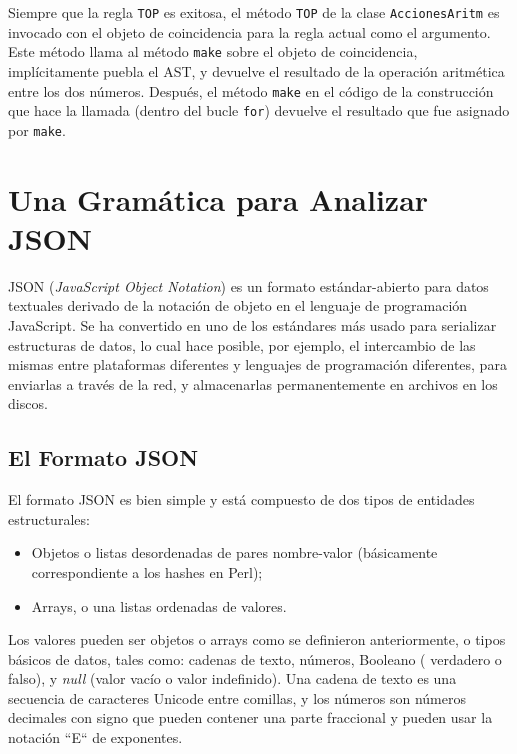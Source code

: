 
Siempre que la regla {\tt TOP} es exitosa, el método {\tt TOP}
de la clase {\tt AccionesAritm} es invocado con el objeto de
coincidencia para la regla actual como el argumento. Este método
llama al método {\tt make} sobre el objeto de coincidencia, 
implícitamente puebla el AST, y devuelve el resultado de la
operación aritmética entre los dos números. Después, el método
{\tt make} en el código de la construcción que hace la llamada 
(dentro del bucle {\tt for}) devuelve el resultado que fue asignado
por {\tt make}.

\section{Una Gramática para Analizar JSON}

JSON (\emph{JavaScript Object Notation}) es un formato 
estándar-abierto para datos textuales derivado de la
notación de objeto en el lenguaje de programación JavaScript.
Se ha convertido en uno de los estándares más usado para
serializar estructuras de datos, lo cual hace posible, por
ejemplo, el intercambio de las mismas entre plataformas diferentes
y lenguajes de programación diferentes, para enviarlas a través 
de la red, y almacenarlas permanentemente en archivos en los
discos.

\subsection{El Formato JSON}

El formato JSON es bien simple y está compuesto de dos tipos
de entidades estructurales:
\begin{itemize}
\item Objetos o listas desordenadas de pares nombre-valor
(básicamente correspondiente a los hashes en Perl);
\item Arrays, o una listas ordenadas de valores.
\end{itemize}

Los valores pueden ser objetos o arrays como se definieron anteriormente,
o tipos básicos de datos, tales como: cadenas de texto, números, Booleano (
verdadero o falso), y \emph{null} (valor vacío o valor indefinido).
Una cadena de texto es una secuencia de caracteres Unicode entre 
comillas, y los números son números decimales con signo que pueden contener
una parte fraccional y pueden usar la notación ``E`` de exponentes.


